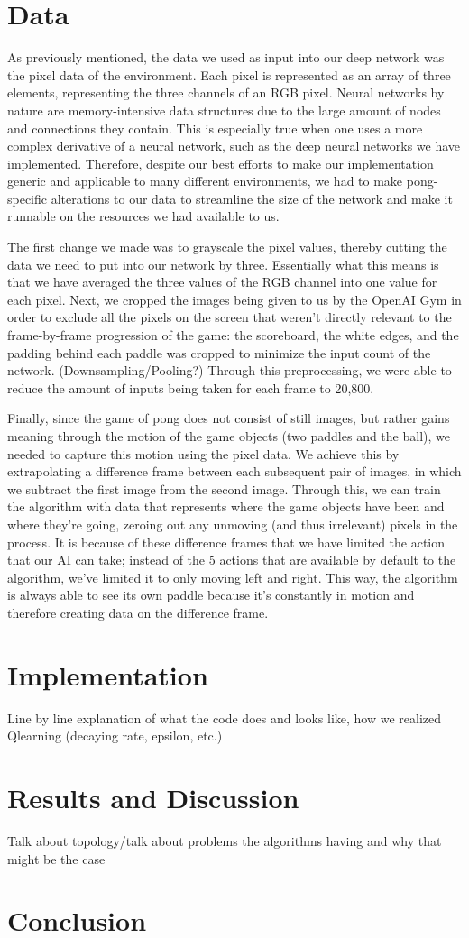 \documentclass[12pt]{article}
\theoremstyle{plain}
\theoremstyle{definition}
\theoremstyle{remark}
\theoremstyle{plain}
\begin{document}
\section{Data}
\par
As previously mentioned, the data we used as input into our deep network was the pixel data of the environment.  Each pixel is represented as an array of three elements, representing the three channels of an RGB pixel.  Neural networks by nature are memory-intensive data structures due to the large amount of nodes and connections they contain.  This is especially true when one uses a more complex derivative of a neural network, such as the deep neural networks we have implemented.  Therefore, despite our best efforts to make our implementation generic and applicable to many different environments, we had to make pong-specific alterations to our data to streamline the size of the network and make it runnable on the resources we had available to us.
\par
The first change we made was to grayscale the pixel values, thereby cutting the data we need to put into our network by three.  Essentially what this means is that we have averaged the three values of the RGB channel into one value for each pixel.  Next, we cropped the images being given to us by the OpenAI Gym in order to exclude all the pixels on the screen that weren't directly relevant to the frame-by-frame progression of the game: the scoreboard, the white edges, and the padding behind each paddle was cropped to minimize the input count of the network.  (Downsampling/Pooling?) Through this preprocessing, we were able to reduce the amount of inputs being taken for each frame to 20,800.
\par
Finally, since the game of pong does not consist of still images, but rather gains meaning through the motion of the game objects (two paddles and the ball), we needed to capture this motion using the pixel data.  We achieve this by extrapolating a difference frame between each subsequent pair of images, in which we subtract the first image from the second image.  Through this, we can train the algorithm with data that represents where the game objects have been and where they're going, zeroing out any unmoving (and thus irrelevant) pixels in the process.  It is because of these difference frames that we have limited the action that our AI can take; instead of the 5 actions that are available by default to the algorithm, we've limited it to only moving left and right.  This way, the algorithm is always able to see its own paddle because it's constantly in motion and therefore creating data on the difference frame.
\section{Implementation}
Line by line explanation of what the code does and looks like, how we realized Qlearning (decaying rate, epsilon, etc.)
\section{Results and Discussion}
Talk about topology/talk about problems the algorithms having and why that might be the case
\section{Conclusion}
\end{document}

